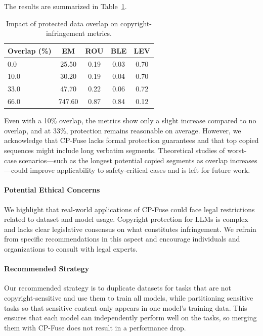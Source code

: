 The results are summarized in Table~\ref{tab:overlap_experiment}.

\begin{table}[ht]
    \centering
    \begin{tabular}{lcccc}
        \toprule
        Overlap (\%) & EM    & ROU   & BLE   & LEV   \\
        \midrule
        0.0          & 25.50 & 0.19  & 0.03  & 0.70  \\
        10.0         & 30.20 & 0.19  & 0.04  & 0.70  \\
        33.0         & 47.70 & 0.22  & 0.06  & 0.72  \\
        66.0         & 747.60 & 0.87  & 0.84  & 0.12  \\
        \bottomrule
    \end{tabular}
    \caption{Impact of protected data overlap on copyright-infringement metrics.}
    \label{tab:overlap_experiment}
\end{table}

Even with a 10\% overlap, the metrics show only a slight increase compared to no overlap, and at 33\%, protection remains reasonable on average. However, we acknowledge that CP-Fuse lacks formal protection guarantees and that top copied sequences might include long verbatim segments. Theoretical studies of worst-case scenarios---such as the longest potential copied segments as overlap increases---could improve applicability to safety-critical cases and is left for future work.

\paragraph{Potential Ethical Concerns} 
We highlight that real-world applications of CP-Fuse could face legal restrictions related to dataset and model usage. Copyright protection for LLMs is complex and lacks clear legislative consensus on what constitutes infringement. We refrain from specific recommendations in this aspect and encourage individuals and organizations to consult with legal experts.

\paragraph{Recommended Strategy} 
Our recommended strategy is to duplicate datasets for tasks that are not copyright-sensitive and use them to train all models, while partitioning sensitive tasks so that sensitive content only appears in one model's training data. This ensures that each model can independently perform well on the tasks, so merging them with CP-Fuse does not result in a performance drop.

